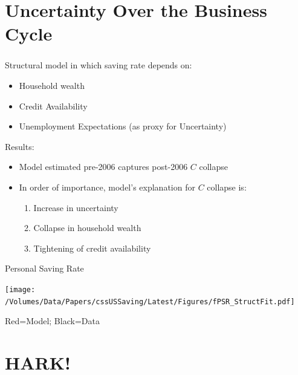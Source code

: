 \documentclass{beamer}
\begin{document}
\section{Uncertainty Over the Business Cycle}

\begin{frame}\frametitle{\cite{cssUSSaving}}
Structural model in which saving rate depends on:
\begin{itemize}
\item Household wealth
\item Credit Availability
\item Unemployment Expectations (as proxy for Uncertainty)
\end{itemize}

Results:

\begin{itemize}
\item Model estimated pre-2006 captures post-2006 $C$ collapse
\item In order of importance, model's explanation for $C$ collapse is:
\begin{enumerate}
\item Increase in uncertainty
\item Collapse in household wealth
\item Tightening of credit availability
\end{enumerate}
\end{itemize}

\end{frame}

\begin{frame}
\begin{center}
\centerline{Personal Saving Rate}

\texttt{[image: /Volumes/Data/Papers/cssUSSaving/Latest/Figures/fPSR\_StructFit.pdf]}

\centerline{Red=Model; Black=Data}
\end{center}
\end{frame}

\section{\bf HARK!}
\end{document}
